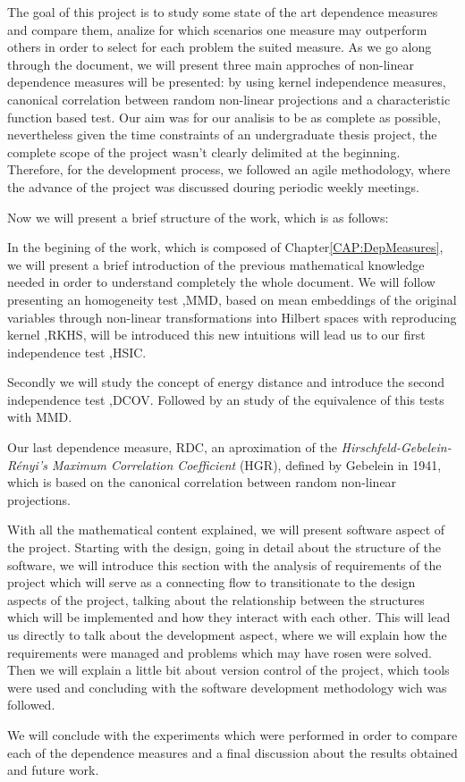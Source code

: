 The goal of this project is to study some state of the art dependence measures and compare them, analize for which scenarios one measure may outperform others in order to select for each problem the suited measure. As we go along through the document, we will present three main approches of non-linear dependence measures will be presented: by using kernel independence measures, canonical correlation between random non-linear projections and a characteristic function based test. 
Our aim was for our analisis to be as complete as possible, nevertheless given the time constraints of an undergraduate thesis project, the complete scope of the project wasn't clearly delimited at the beginning. Therefore, for the development process, we followed an agile methodology, where the advance of the project was discussed douring periodic weekly meetings.

Now we will present a brief structure of the work, which is as follows:

In the begining of the work, which is composed of Chapter\cref{CAP:DepMeasures}, we will present a brief introduction of the previous mathematical knowledge needed in order to understand completely the whole document. We will follow presenting an homogeneity test ,MMD, based on mean embeddings of the original variables through non-linear transformations into Hilbert spaces with reproducing kernel ,RKHS, will be introduced this new intuitions will lead us to our first independence test ,HSIC.

Secondly we will study the concept of energy distance and introduce the second independence test ,DCOV. Followed by an study of the equivalence of this tests with MMD.

Our last dependence measure, RDC, an aproximation of the \textit{Hirschfeld-Gebelein-Rényi’s Maximum Correlation
Coefficient} (HGR), defined by Gebelein in 1941, which is based on the canonical correlation between random non-linear projections.

With all the mathematical content explained, we will present software aspect of the project. 
Starting with the design, going in detail about the structure of the software, we will introduce this section with the analysis of requirements of the project which will serve as a connecting flow to transitionate to the design aspects of the project, talking about the relationship between the structures which will be implemented and how they interact with each other.
This will lead us directly to talk about the development aspect, where we will explain how the requirements were managed and problems which may have rosen were solved. Then we will explain a little bit about version control of the project, which tools were used and concluding with the software development methodology wich was followed.

We will conclude with the experiments which were performed in order to compare each of the dependence measures and a final discussion about the results obtained and future work.





